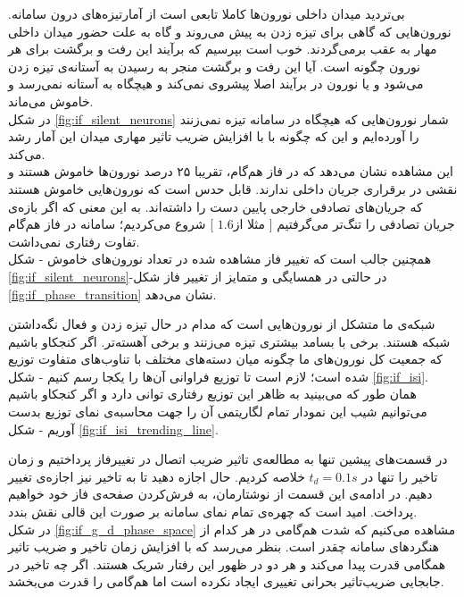 بی‌تردید میدان داخلی نورون‌ها کاملا تابعی است از آمارتیزه‌های درون سامانه. نورون‌هایی که گاهی برای تیزه زدن به پیش می‌روند و گاه به علت حضور میدان داخلی مهار به عقب برمی‌گردند. خوب است بپرسیم که برآیند این رفت و برگشت‌ برای هر نورون چگونه است. آیا این رفت و برگشت منجر به رسیدن به آستانه‌ی تیزه زدن می‌شود و یا نورون در برآیند اصلا پیشروی نمی‌کند و هیچگاه به آستانه نمی‌رسد و خاموش می‌ماند.\\
در شکل \ref{fig:if_silent_neurons} شمار نورون‌هایی که هیچگاه در سامانه تیزه نمی‌زنند را آورده‌ایم و این که چگونه با با افزایش ضریب تاثیر مهاری میدان این آمار رشد می‌کند.\\
این مشاهده نشان می‌دهد که در فاز هم‌گام، تقریبا ۲۵ درصد نورون‌ها خاموش هستند و نقشی در برقراری جریان داخلی ندارند. قابل حدس است که نورون‌هایی خاموش هستند که جریان‌های تصادفی خارجی پایین دست را داشته‌اند. به این معنی که اگر بازه‌ی جریان تصادفی را تنگ‌تر می‌گرفتیم [ مثلا از$1.6$ ] شروع می‌کردیم؛ سامانه در فاز هم‌گام تفاوت رفتاری نمی‌داشت.\\
همچنین جالب است که تغییر فاز مشاهده شده در تعداد نورون‌های خاموش - شکل \ref{fig:if_silent_neurons}-در حالتی در همسایگی و متمایز از تغییر فاز شکل \ref{fig:if_phase_transition} نشان می‌دهد.


شبکه‌ی ما متشکل از نورون‌هایی است که مدام در حال تیزه زدن و فعال نگه‌داشتن شبکه هستند. برخی با بسامد بیشتری تیزه می‌زنند و برخی آهسته‌تر. اگر کنجکاو باشیم که جمعیت کل نورون‌های ما چگونه میان دسته‌های مختلف با تناوب‌های متفاوت توزیع شده‌ است؛ لازم است تا توزیع فراوانی آن‌ها را یکجا رسم کنیم - شکل \ref{fig:if_isi}.\\
همان طور که می‌بینید به ظاهر این توزیع رفتاری توانی دارد و اگر کنجکاو باشیم می‌توانیم شیب این نمودار تمام لگاریتمی آن را جهت محاسبه‌ی نمای توزیع بدست آوریم - شکل \ref{fig:if_isi_trending_line}.

در قسمت‌های پیشین تنها به مطالعه‌ی تاثیر ضریب اتصال در تغییرفاز پرداختیم و زمان تاخیر را تنها در $t_d = 0.1 s$ خلاصه کردیم. حال اجازه دهید تا به تاخیر نیز اجازه‌ی تغییر دهیم. در ادامه‌ی این قسمت از نوشتارمان، به فرش‌کردن صفحه‌ی فاز خود خواهیم پرداخت. امید است که چهره‌ی تمام نمای سامانه‌ بر صورت این قالی نقش بندد.\\


در شکل \ref{fig:if_g_d_phase_space} مشاهده می‌کنیم که شدت هم‌گامی در هر کدام از هنگردهای سامانه چقدر است. بنظر می‌رسد که با افزایش زمان تاخیر و ضریب تاثیر همگامی قدرت پیدا می‌کند و هر دو در ظهور این رفتار شریک هستند. اگر چه تاخیر در جابجایی ضریب‌تاثیر بحرانی تغییری ایجاد نکرده است اما هم‌گامی را قدرت می‌بخشد.

